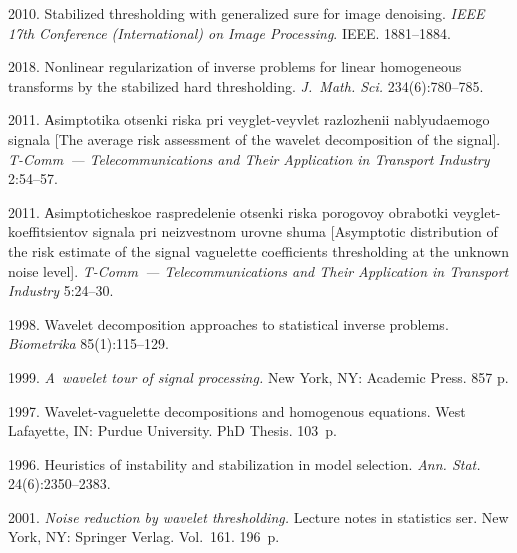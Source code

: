   \begin{multicols}{2}

\renewcommand{\bibname}{\protect\rmfamily References}

{\small\frenchspacing
 {%
 \begin{thebibliography}{99}
 2010. 
Stabilized thresholding with generalized sure for image denoising. 
\textit{IEEE 17th Conference (International) on Image Processing}. IEEE. 1881--1884.

 

 2018. 
Nonlinear regularization of inverse problems for linear homogeneous transforms 
by the stabilized hard thresholding. 
\textit{J.~Math. Sci.} 234(6):780--785.

 2011. Аsimptotika otsenki riska pri 
veyglet-veyvlet razlozhenii nablyuda\-emo\-go signala [The average risk assessment 
of the wavelet decomposition of the signal].
\textit{T-Comm~--- Telecommunications and Their Application in
Transport Industry} 2:54--57.

 2011. Аsimptoticheskoe raspredelenie 
otsenki riska porogovoy ob\-ra\-bot\-ki veyglet-koeffitsientov signala pri 
neizvestnom urovne shuma [Asymptotic distribution of the risk estimate of 
the signal vaguelette coefficients thresholding at the unknown noise level]. 
\textit{T-Comm~--- Telecommunications and Their Application in
Transport Industry} 5:24--30.

 1998. Wavelet 
decomposition approaches to statistical inverse problems. 
\textit{Biometrika} 85(1):115--129.

 1999. \textit{A~wavelet tour of signal processing.} New York, NY: 
Academic Press. 857 p.

 1997. Wavelet-vaguelette decompositions and homogenous equations. 
 West Lafayette, IN: Purdue University. PhD Thesis. 103~p.

 1996. 
Heuristics of instability and stabilization in model selection. 
\textit{Ann. Stat.} 24(6):2350--2383.

 2001. \textit{Noise reduction by wavelet thresholding.} 
Lecture notes in statistics ser.
New York, NY: Springer Verlag.  Vol.~161. 196~p.


\end{thebibliography}}}
\end{multicols}
